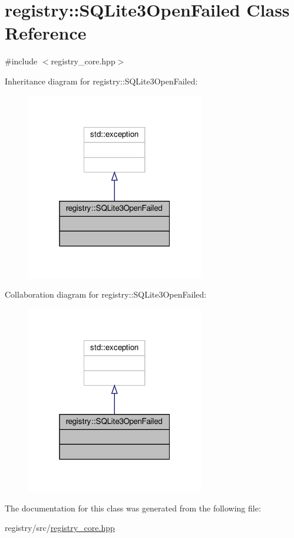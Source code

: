 \hypertarget{classregistry_1_1SQLite3OpenFailed}{}\section{registry\+:\+:S\+Q\+Lite3\+Open\+Failed Class Reference}
\label{classregistry_1_1SQLite3OpenFailed}


{\ttfamily \#include $<$registry\+\_\+core.\+hpp$>$}



Inheritance diagram for registry\+:\+:S\+Q\+Lite3\+Open\+Failed\+:
\nopagebreak
\begin{figure}[H]
\begin{center}
\leavevmode
\includegraphics[width=220pt]{classregistry_1_1SQLite3OpenFailed__inherit__graph}
\end{center}
\end{figure}


Collaboration diagram for registry\+:\+:S\+Q\+Lite3\+Open\+Failed\+:
\nopagebreak
\begin{figure}[H]
\begin{center}
\leavevmode
\includegraphics[width=220pt]{classregistry_1_1SQLite3OpenFailed__coll__graph}
\end{center}
\end{figure}


The documentation for this class was generated from the following file\+:\begin{DoxyCompactItemize}
\item 
registry/src/\hyperlink{registry__core_8hpp}{registry\+\_\+core.\+hpp}\end{DoxyCompactItemize}
